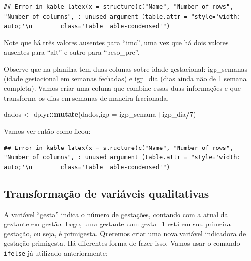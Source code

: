 \documentclass[
]{book}
\newenvironment{Shaded}{\begin{snugshade}}{\end{snugshade}}
\newcommand{\CommentTok}[1]{\textcolor[rgb]{0.56,0.35,0.01}{\textit{#1}}}
\newcommand{\DataTypeTok}[1]{\textcolor[rgb]{0.13,0.29,0.53}{#1}}
\newcommand{\DecValTok}[1]{\textcolor[rgb]{0.00,0.00,0.81}{#1}}
\newcommand{\KeywordTok}[1]{\textcolor[rgb]{0.13,0.29,0.53}{\textbf{#1}}}
\newcommand{\NormalTok}[1]{#1}
\newcommand{\OperatorTok}[1]{\textcolor[rgb]{0.81,0.36,0.00}{\textbf{#1}}}
\newcommand{\StringTok}[1]{\textcolor[rgb]{0.31,0.60,0.02}{#1}}
\begin{document}
\begin{verbatim}
## Error in kable_latex(x = structure(c("Name", "Number of rows", "Number of columns", : unused argument (table.attr = "style='width: auto;'\n        class='table table-condensed'")
\end{verbatim}

Note que há três valores ausentes para ``imc'', uma vez que há dois valores ausentes para ``alt'' e outro para ``peso\_pre''.

Observe que na planilha tem duas colunas sobre idade gestacional: igp\_semanas (idade gestacional em semanas fechadas) e igp\_dia (dias ainda não de 1 semana completa). Vamos criar uma coluna que combine essas duas informações e que transforme os dias em semanas de maneira fracionada.

\begin{Shaded}
\begin{Highlighting}[]
\NormalTok{dados <-}\StringTok{ }\NormalTok{dplyr}\OperatorTok{::}\KeywordTok{mutate}\NormalTok{(dados,}\DataTypeTok{igp =}\NormalTok{ igp_semana}\OperatorTok{+}\NormalTok{igp_dia}\OperatorTok{/}\DecValTok{7}\NormalTok{)}
\end{Highlighting}
\end{Shaded}

Vamos ver então como ficou:

\begin{Shaded}
\end{Shaded}

\begin{verbatim}
## Error in kable_latex(x = structure(c("Name", "Number of rows", "Number of columns", : unused argument (table.attr = "style='width: auto;'\n        class='table table-condensed'")
\end{verbatim}

\hypertarget{transformauxe7uxe3o-de-variuxe1veis-qualitativas}{%
\subsection{Transformação de variáveis qualitativas}\label{transformauxe7uxe3o-de-variuxe1veis-qualitativas}}

A variável ``gesta'' indica o número de gestações, contando com a atual da gestante em gestão. Logo, uma gestante com gesta=1 está em sua primeira gestação, ou seja, é primigesta. Queremos criar uma nova variável indicadora de gestação primigesta. Há diferentes forma de fazer isso. Vamos usar o comando \texttt{ifelse} já utilizado anteriormente:
\end{document}
